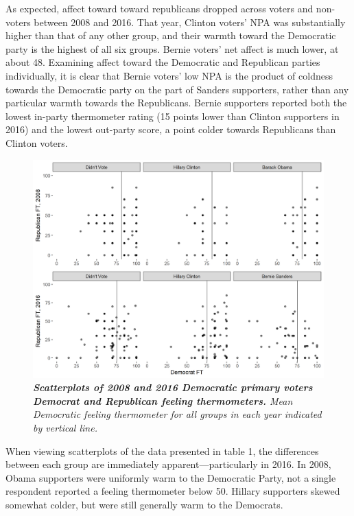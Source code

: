 \documentclass[12pt]{article}
\begin{document}
As expected, affect toward toward republicans dropped across voters and non-voters between 2008 and 2016.  That year, Clinton voters' NPA was substantially higher than that of any other group, and their warmth toward the Democratic party is the highest of all six groups. Bernie voters' net affect is much lower, at about 48. Examining affect toward the Democratic and Republican parties individually, it is clear that Bernie voters' low NPA is the product of coldness towards the Democratic party on the part of Sanders supporters, rather than any particular warmth towards the Republicans. Bernie supporters reported both the lowest in-party thermometer rating (15 points lower than Clinton supporters in 2016) and the lowest out-party score, a point colder towards Republicans than Clinton voters.

\begin{figure}[H]
\center\includegraphics[width=6in]{primary-scatter.png}
\caption{\label{fig:primary-scatter} \textit{\textbf{Scatterplots of 2008 and 2016 Democratic primary voters Democrat and Republican feeling thermometers.} Mean Democratic feeling thermometer for all groups in each year indicated by vertical line.}}
\end{figure}

When viewing scatterplots of the data presented in table 1, the differences between each group are immediately apparent---particularly in 2016. In 2008, Obama supporters were uniformly warm to the Democratic Party, not a single respondent reported a feeling thermometer below 50. Hillary supporters skewed somewhat colder, but were still generally warm to the Democrats. 
\end{document}
